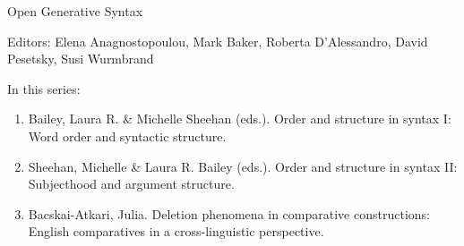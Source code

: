 {\large Open Generative Syntax}

\bigskip

Editors:   Elena Anagnostopoulou,
    Mark Baker,
    Roberta D’Alessandro,
    David Pesetsky,
    Susi Wurmbrand


\bigskip

In this series:

\begin{enumerate}
\item Bailey, Laura R. \& Michelle Sheehan (eds.). Order and structure in syntax I: Word order and syntactic structure.
\item Sheehan, Michelle \& Laura R. Bailey (eds.).  Order and structure in syntax II: Subjecthood and argument structure.
\item Bacskai-Atkari, Julia. Deletion phenomena in comparative constructions: English comparatives in a cross-linguistic perspective.
\end{enumerate}



\vfill



